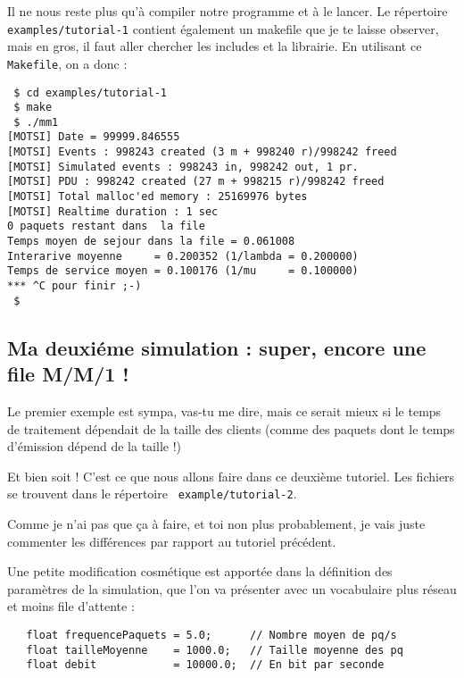    Il ne nous reste plus qu'à compiler notre programme et à le
lancer. Le répertoire {\tt examples/tutorial-1} contient également un
makefile que je te laisse observer, mais en gros, il faut aller
chercher les includes et la librairie. En utilisant ce {\tt Makefile},
on a donc :

\begin{verbatim}
 $ cd examples/tutorial-1
 $ make
 $ ./mm1
[MOTSI] Date = 99999.846555
[MOTSI] Events : 998243 created (3 m + 998240 r)/998242 freed
[MOTSI] Simulated events : 998243 in, 998242 out, 1 pr.
[MOTSI] PDU : 998242 created (27 m + 998215 r)/998242 freed
[MOTSI] Total malloc'ed memory : 25169976 bytes
[MOTSI] Realtime duration : 1 sec
0 paquets restant dans  la file
Temps moyen de sejour dans la file = 0.061008
Interarive moyenne     = 0.200352 (1/lambda = 0.200000)
Temps de service moyen = 0.100176 (1/mu     = 0.100000)
*** ^C pour finir ;-)
 $
\end{verbatim}

%
\subsection{Ma deuxiéme simulation : super, encore une file M/M/1 !}

   Le premier exemple est sympa, vas-tu me dire, mais ce serait mieux
si le temps de traitement dépendait de la taille des clients (comme
des paquets dont le temps d'émission dépend de la taille !)

   Et bien soit ! C'est ce que nous allons faire dans ce deuxième
tutoriel. Les fichiers se trouvent dans le répertoire {\tt
example/tutorial-2}.

   Comme je n'ai pas que ça à faire, et toi non plus probablement, je
vais juste commenter les différences par rapport au tutoriel
précédent.

   Une petite modification cosmétique est apportée dans la définition
des paramètres de la simulation, que l'on va présenter avec un
vocabulaire plus réseau et moins file d'attente :

\begin{verbatim}
   float frequencePaquets = 5.0;      // Nombre moyen de pq/s
   float tailleMoyenne    = 1000.0;   // Taille moyenne des pq
   float debit            = 10000.0;  // En bit par seconde
\end{verbatim}

